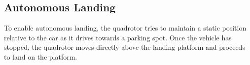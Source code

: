 \subsection{Autonomous Landing}

To enable autonomous landing, the quadrotor tries to maintain a static position
relative to the car as it drives towards a parking spot. Once the vehicle has
stopped, the quadrotor moves directly above the landing platform and proceeds
to land on the platform.
